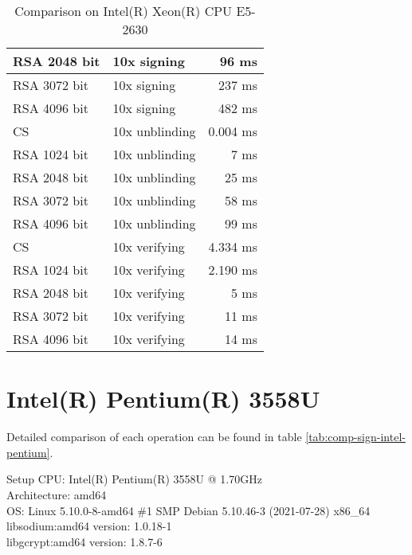 \begin{table}[ht]
\begin{tabular}{llr}
        RSA 2048 bit & 10x signing &  96 ms \\\hline
        RSA 3072 bit & 10x signing &  237 ms \\\hline
        RSA 4096 bit & 10x signing &  482 ms \\\hline
        \hline
        CS & 10x unblinding &  0.004 ms \\\hline
        RSA 1024 bit & 10x unblinding & 7 ms \\\hline
        RSA 2048 bit & 10x unblinding & 25 ms \\\hline
        RSA 3072 bit & 10x unblinding & 58 ms \\\hline
        RSA 4096 bit & 10x unblinding & 99 ms \\\hline
        \hline
        CS & 10x verifying & 4.334 ms \\\hline
        RSA 1024 bit & 10x verifying & 2.190 ms \\\hline
        RSA 2048 bit & 10x verifying & 5 ms \\\hline
        RSA 3072 bit & 10x verifying & 11 ms \\\hline
        RSA 4096 bit & 10x verifying & 14 ms \\\hline
    \end{tabular}
    \caption{Comparison on Intel(R) Xeon(R) CPU E5-2630}
    \label{tab:comp-sign-intel-xeon}
\end{table}

\section{Intel(R) Pentium(R) 3558U}
Detailed comparison of each operation can be found in table \ref{tab:comp-sign-intel-pentium}.
\begin{bfhBox}{Setup}
	CPU: Intel(R) Pentium(R) 3558U @ 1.70GHz \\
    Architecture: amd64 \\
    OS: Linux 5.10.0-8-amd64 \#1 SMP Debian 5.10.46-3 (2021-07-28) x86\_64\\
    libsodium:amd64 version:  1.0.18-1\\ 
    libgcrypt:amd64 version:  1.8.7-6
\end{bfhBox}

